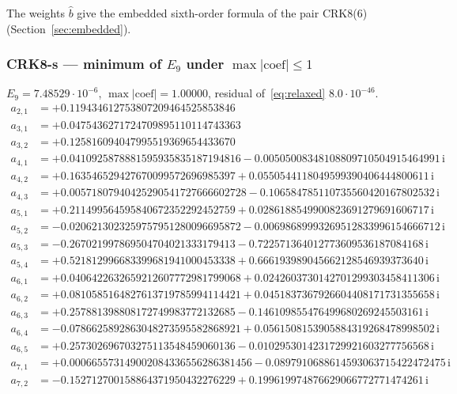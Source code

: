 The weights $\hat b$ give the embedded sixth-order formula of the pair CRK8(6) (Section~\ref{sec:embedded}).
\subsubsection*{CRK8-s --- minimum of $E_9$ under $\max|\text{coef}|\le1$}
$E_{9}=7.48529\cdot10^{-6}$, $\max|\text{coef}|=1.00000$, residual of~\eqref{eq:relaxed} $8.0\cdot10^{-46}$.
{\small\allowdisplaybreaks
\begin{align*}
a_{2,1} &= +0.119434612753807209464525853846\\
a_{3,1} &= +0.0475436271724709895110114743363\\
a_{3,2} &= +0.125816094047995519369654433670\\
a_{4,1} &= +0.0410925878881595935835187194816 - 0.00505008348108809710504915464991\,\mathrm{i}\\
a_{4,2} &= +0.163546529427670099572696985397 + 0.0550544118049599390406444800611\,\mathrm{i}\\
a_{4,3} &= +0.00571807940425290541727666602728 - 0.106584785110735560420167802532\,\mathrm{i}\\
a_{5,1} &= +0.211499564595840672352292452759 + 0.0286188549900823691279691606717\,\mathrm{i}\\
a_{5,2} &= -0.0206213023259757951280096695872 - 0.00698689993269512833996154666712\,\mathrm{i}\\
a_{5,3} &= -0.267021997869504704021333179413 - 0.722571364012773609536187084168\,\mathrm{i}\\
a_{5,4} &= +0.521812996683399681941000453338 + 0.666193989045662128546939373640\,\mathrm{i}\\
a_{6,1} &= +0.0406422632659212607772981799068 + 0.0242603730142701299303458411306\,\mathrm{i}\\
a_{6,2} &= +0.0810585164827613719785994114421 + 0.0451837367926604408171731355658\,\mathrm{i}\\
a_{6,3} &= +0.257881398808172749983772132685 - 0.146109855476499680269245503161\,\mathrm{i}\\
a_{6,4} &= -0.0786625892863048273595582868921 + 0.0561508153905884319268478998502\,\mathrm{i}\\
a_{6,5} &= +0.257302696703275113548459060136 - 0.0102953014231729921603277756568\,\mathrm{i}\\
a_{7,1} &= +0.000665573149002084336556286381456 - 0.0897910688614593063715422472475\,\mathrm{i}\\
a_{7,2} &= -0.152712700158864371950432276229 + 0.199619974876629066772771474261\,\mathrm{i}\\

\end{align*}}
